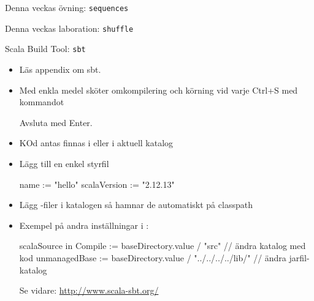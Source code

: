 
\ifkompendium\else


\begin{Slide}{Denna veckas övning: \texttt{sequences}}
\begin{itemize}\SlideFontTiny

\end{itemize}
\end{Slide}

\begin{Slide}{Denna veckas laboration: \texttt{shuffle}}
\begin{itemize}\SlideFontSmall

\end{itemize}
\end{Slide}
\fi

\begin{Slide}{Scala Build Tool: \texttt{sbt}}\SlideFontSmall
\begin{itemize}
\item Läs appendix om sbt.
\item Med enkla medel sköter  omkompilering och körning vid varje Ctrl+S med kommandot  
Avsluta med Enter.
\item KOd antas finnas i  eller i aktuell katalog
\item Lägg till en enkel styrfil 
\begin{Code}
name := "hello"
scalaVersion := "2.12.13" 
\end{Code}
\item Lägg -filer i katalogen  så hamnar de automatiskt på classpath
\item Exempel på andra inställningar i :
\begin{CodeSmall}
scalaSource in Compile := baseDirectory.value / "src"     // ändra katalog med kod
unmanagedBase := baseDirectory.value / "../../../../lib/" // ändra jarfil-katalog
\end{CodeSmall}
Se vidare: \url{http://www.scala-sbt.org/}
\end{itemize}
\end{Slide}
